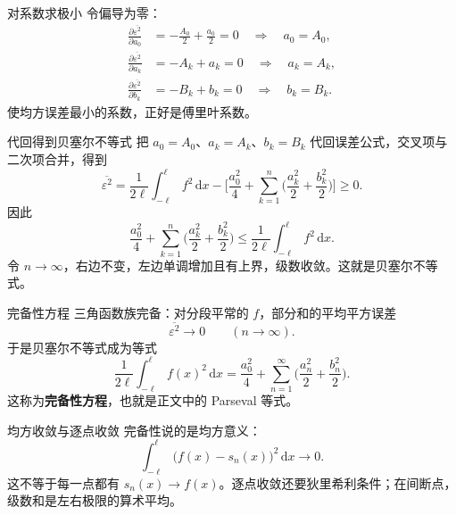 \documentclass[fontset=windows, chinese, 10pt, xcolor=dvipsnames]{beamer}
\begin{document}
\begin{frame}{对系数求极小}
  令偏导为零：
  \begin{align*}
    \frac{\partial\overline{\varepsilon^2}}{\partial a_0}
    &=-\frac{A_0}{2}+\frac{a_0}{2}=0
    \quad\Rightarrow\quad a_0=A_0,\\[0.3em]
    \frac{\partial\overline{\varepsilon^2}}{\partial a_k}
    &=-A_k+a_k=0
    \quad\Rightarrow\quad a_k=A_k,\\[0.3em]
    \frac{\partial\overline{\varepsilon^2}}{\partial b_k}
    &=-B_k+b_k=0
    \quad\Rightarrow\quad b_k=B_k.
  \end{align*}
  使均方误差最小的系数，正好是傅里叶系数。
\end{frame}

\begin{frame}{代回得到贝塞尔不等式}
  把 $a_0=A_0$、$a_k=A_k$、$b_k=B_k$ 代回误差公式，交叉项与二次项合并，得到
  \begin{equation*}
    \overline{\varepsilon^2}
    =\frac{1}{2\ell}\int_{-\ell}^{\ell} f^2\,\mathrm{d}x
     -\Biggl[
       \frac{a_0^2}{4}
       +\sum_{k=1}^{n}
         \Biggl(\frac{a_k^2}{2}+\frac{b_k^2}{2}\Biggr)
     \Biggr]
    \geq 0.
  \end{equation*}
  因此
  \begin{equation*}
    \frac{a_0^2}{4}
    +\sum_{k=1}^{n}
      \Biggl(\frac{a_k^2}{2}+\frac{b_k^2}{2}\Biggr)
    \leq\frac{1}{2\ell}\int_{-\ell}^{\ell} f^2\,\mathrm{d}x.
  \end{equation*}
  令 $n\to\infty$，右边不变，左边单调增加且有上界，级数收敛。这就是贝塞尔不等式。
\end{frame}

\begin{frame}{完备性方程}
  三角函数族完备：对分段平常的 $f$，部分和的平均平方误差
  \begin{equation*}
    \overline{\varepsilon^2}\to 0
    \qquad(n\to\infty).
  \end{equation*}
  于是贝塞尔不等式成为等式
  \begin{equation*}
    \frac{1}{2\ell}\int_{-\ell}^{\ell} f(x)^2\,\mathrm{d}x
    =\frac{a_0^2}{4}
     +\sum_{n=1}^{\infty}\Biggl(\frac{a_n^2}{2}+\frac{b_n^2}{2}\Biggr).
  \end{equation*}
  这称为\textbf{完备性方程}，也就是正文中的 Parseval 等式。
\end{frame}

\begin{frame}{均方收敛与逐点收敛}
  完备性说的是均方意义：
  \begin{equation*}
    \int_{-\ell}^{\ell}\bigl(f(x)-s_n(x)\bigr)^2\,\mathrm{d}x\to 0.
  \end{equation*}
  这不等于每一点都有 $s_n(x)\to f(x)$。逐点收敛还要狄里希利条件；在间断点，级数和是左右极限的算术平均。
\end{frame}
\end{document}
